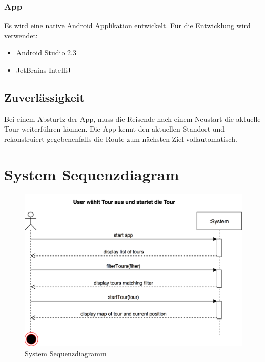 \documentclass[a4paper,10pt,xetex]{article}
\begin{document}
\subsubsection{App}\label{app}
Es wird eine native Android Applikation entwickelt. Für die Entwicklung
wird verwendet:

\begin{itemize}
  \item Android Studio 2.3
  \item JetBrains IntelliJ
\end{itemize}


\subsection{Zuverlässigkeit}\label{zuverluxe4ssigkeit}
Bei einem Absturtz der App, muss die Reisende nach einem Neustart die
aktuelle Tour weiterführen können. Die App kennt den aktuellen Standort
und rekonstruiert gegebenenfalls die Route zum nächsten Ziel
vollautomatisch.


\section{System Sequenzdiagram}\label{systemsequenzdiagram}

\begin{figure}
\centering
\includegraphics{UC1_SystemSequenzDiagram}
\caption{System Sequenzdiagramm}
\end{figure}
\end{document}

